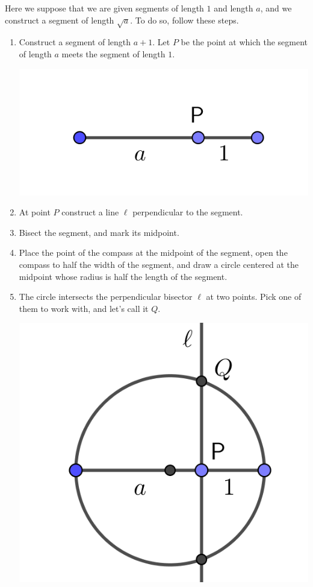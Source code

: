 \documentclass[11pt]{article}
\newenvironment{task}
	{\begin{mdframed}[linecolor=lightgray, linewidth=3pt]\raggedright}
	{\end{mdframed}}
\theoremstyle{definition}
\begin{document}
\begin{task}
  Here we suppose that we are given segments of length $1$ and length $a$, and we construct a segment of length $\sqrt{a}$. To do so, follow these
  steps.
  \begin{enumerate}
    \item Construct a segment of length $a+1$. Let $P$ be the point at which the segment of length $a$ meets the segment of length $1$.
  \begin{center}
    \includegraphics[scale=.75]{Images/square_roots_1.png}
  \end{center}
    \item At point $P$ construct a line $\ell$ perpendicular to the segment.
    \item Bisect the segment, and mark its midpoint.
    \item Place the point of the compass at the midpoint of the segment, open the compass to half the width of the segment, and draw a circle 
      centered at the midpoint whose radius is half the length of the segment.
    \item The circle intersects the perpendicular bisector $\ell$ at two points. Pick one of them to work with, and let's call it $Q$.
  \begin{center}
    \includegraphics[scale=.75]{Images/square_roots_3.png}

\end{center}
\end{enumerate}
\end{task}
\end{document}

